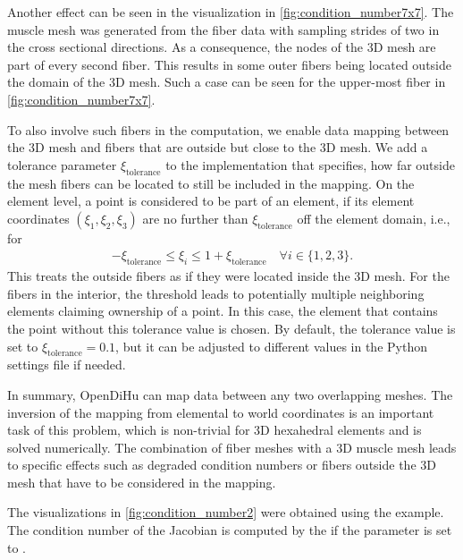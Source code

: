 Another effect can be seen in the visualization in \cref{fig:condition_number7x7}. The muscle mesh was generated from the fiber data with sampling strides of two in the cross sectional directions. As a consequence, the nodes of the 3D mesh are part of every second fiber. This results in some outer fibers being located outside the domain of the 3D mesh. Such a case can be seen for the upper-most fiber in \cref{fig:condition_number7x7}. 

To also involve such fibers in the computation, we enable data mapping between the 3D mesh and fibers that are outside but close to the 3D mesh. We add a tolerance parameter $\xi_\text{tolerance}$ to the implementation that specifies, how far outside the mesh fibers can be located to still be included in the mapping. On the element level, a point is considered to be part of an element, if its element coordinates $(\xi_1,\xi_2,\xi_3)$ are no further than $\xi_\text{tolerance}$ off the element domain, i.e., for %
\begin{align*}
  -\xi_\text{tolerance} \leq \xi_i \leq 1 + \xi_\text{tolerance}\quad \forall i \in \{1,2,3\}.
\end{align*}
This treats the outside fibers as if they were located inside the 3D mesh. For the fibers in the interior, the threshold leads to potentially multiple neighboring elements claiming ownership of a point. In this case, the element that contains the point without this tolerance value is chosen.
By default, the tolerance value is set to $\xi_\text{tolerance}=0.1$, but it can be adjusted to different values in the Python settings file if needed.

In summary, OpenDiHu can map data between any two overlapping meshes. The inversion of the mapping from elemental to world coordinates is an important task of this problem, which is non-trivial for 3D hexahedral elements and is solved numerically. The combination of fiber meshes with a 3D muscle mesh leads to specific effects such as degraded condition numbers or fibers outside the 3D mesh that have to be considered in the mapping.

\begin{reproduce_no_break}
  The visualizations in \cref{fig:condition_number2} were obtained using the  example. The condition number of the Jacobian is computed by the  if the parameter  is set to .
\end{reproduce_no_break}
